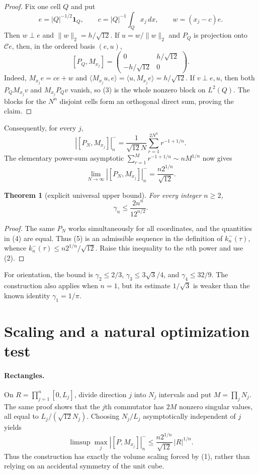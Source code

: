 \documentclass[11pt]{article}
\newtheorem{theorem}{Theorem}
\newcommand{\C}{\mathcal C}
\begin{document}
\begin{proof}
Fix one cell $Q$ and put
\[
 e=|Q|^{-1/2}\mathbf1_Q,\qquad
 c=|Q|^{-1}\int_Qx_j\,dx,\qquad
 w=(x_j-c)e.
\]
Then $w\perp e$ and $\|w\|_2=h/\sqrt{12}$.  If
$u=w/\|w\|_2$ and $P_Q$ is projection onto $\C e$, then, in the ordered
basis $(e,u)$,
\[
 [P_Q,M_{x_j}]=
 \begin{pmatrix}0&h/\sqrt{12}\\-h/\sqrt{12}&0\end{pmatrix}.
 \tag{3}
\]
Indeed, $M_{x_j}e=ce+w$ and
$\langle M_{x_j}u,e\rangle=\langle u,M_{x_j}e\rangle=h/\sqrt{12}$.
If $v\perp e,u$, then both $P_QM_{x_j}v$ and $M_{x_j}P_Qv$ vanish, so (3)
is the whole nonzero block on $L^2(Q)$.  The blocks for the $N^n$ disjoint
cells form an orthogonal direct sum, proving the claim.
\end{proof}

Consequently, for every $j$,
\[
 |[P_N,M_{x_j}]|_n^-
 =\frac1{\sqrt{12}N}\sum_{r=1}^{2N^n}r^{-1+1/n}.       \tag{4}
\]
The elementary power-sum asymptotic
$\sum_{r=1}^M r^{-1+1/n}\sim nM^{1/n}$ now gives
\[
 \lim_{N\to\infty}|[P_N,M_{x_j}]|_n^-
 =\frac{n2^{1/n}}{\sqrt{12}}.                          \tag{5}
\]

\begin{theorem}[explicit universal upper bound]\label{thm:main}
For every integer $n\ge2$,
\[
                       \boxed{\displaystyle
                       \gamma_n\le\frac{2n^n}{12^{n/2}}.}
\]
\end{theorem}

\begin{proof}
The same $P_N$ works simultaneously for all coordinates, and the quantities
in (4) are equal.  Thus (5) is an admissible sequence in the definition of
$k_n^-(\tau)$, whence
$k_n^-(\tau)\le n2^{1/n}/\sqrt{12}$.  Raise this inequality to the $n$th
power and use (2).
\end{proof}

For orientation, the bound is $\gamma_2\le2/3$,
$\gamma_3\le3\sqrt3/4$, and $\gamma_4\le32/9$.  The construction also
applies when $n=1$, but its estimate $1/\sqrt3$ is weaker than the known
identity $\gamma_1=1/\pi$.

\section{Scaling and a natural optimization test}

\paragraph{Rectangles.}
On $R=\prod_{j=1}^n[0,L_j]$, divide direction $j$ into $N_j$ intervals and
put $M=\prod_jN_j$.  The same proof shows that the $j$th commutator has
$2M$ nonzero singular values, all equal to
$L_j/(\sqrt{12}N_j)$.  Choosing $N_j/L_j$ asymptotically independent of
$j$ yields
\[
 \limsup\max_j|[P,M_{x_j}]|_n^-
 \le \frac{n2^{1/n}}{\sqrt{12}}\,|R|^{1/n}.
\]
Thus the construction has exactly the volume scaling forced by (1), rather
than relying on an accidental symmetry of the unit cube.
\end{document}
